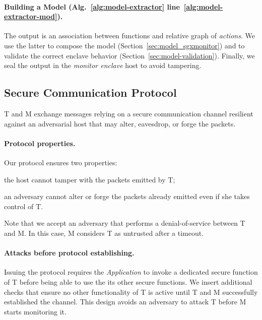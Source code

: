 \paragraph{Building a Model (Alg.~\ref{alg:model-extractor} 	
	line~\ref{alg:model-extractor-mod}).}
The output is an association between functions and relative graph of 
\emph{actions}.
We use the latter to compose the model (Section~\ref{sec:model_sgxmonitor}) and 
to 
validate the correct enclave behavior (Section~\ref{sec:model-validation}).
Finally, we seal the output in the \emph{monitor enclave} host to avoid 
tampering.

\subsection{Secure Communication Protocol}
\label{ssec:secure-communication-protocol}

T and M exchange messages relying on a secure communication channel resilient 
against an adversarial host that may alter, eavesdrop, or forge the packets.

\paragraph{Protocol properties.}
Our protocol ensures two properties:
\begin{enumerate*}[label=(\roman*)]
	\item the host cannot tamper with the packets emitted by T;
	\item an adversary cannot alter or forge the packets already emitted even 
	if she takes control of T.
\end{enumerate*}
Note that we accept an adversary that performs a denial-of-service between T 
and M.
In this case, M considers T as untrusted after a timeout.

\paragraph{Attacks before protocol establishing.} 
Issuing the protocol requires the \emph{Application} to invoke a dedicated 
secure function of T before being able to use the its other secure functions.
We insert additional checks that ensure no other 
functionality of T is active until T and M successfully established the channel.
This design avoids an adversary to attack T before M starts monitoring it.

